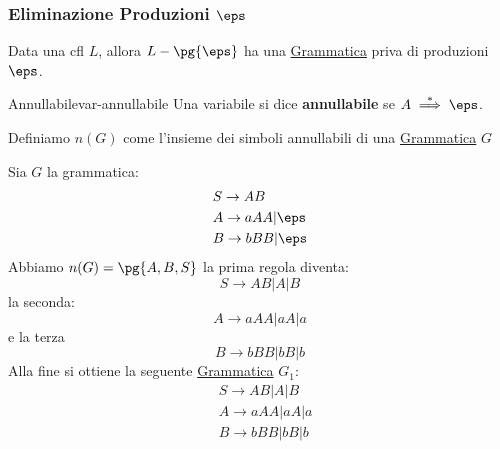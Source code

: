 \subsubsection{Eliminazione Produzioni $\eps$}\label{sub:ll_eliminazione_produzioni_eps} %
Data una \ac{cfl} $L$, allora $L - \pg{\eps}$ ha una \hyperref[def:cfg]{Grammatica} priva di produzioni $\eps$.
\begin{definition}{Annullabile}{var-annullabile}
    Una variabile si dice \textbf{annullabile} se $A \overset{*}{\implies}\eps$.
\end{definition}
\begin{note}
    Definiamo $n(G)$ come l'insieme dei simboli annullabili di una \hyperref[def:cfg]{Grammatica} $G$
\end{note}
\begin{example}{}{}
    Sia $G$ la grammatica:
    \[
        \begin{aligned}
            &S\to AB \\
            &A\to aAA|\eps \\
            &B\to bBB|\eps
        \end{aligned}
    \]
    Abbiamo $n(G) = \pg{A,B,S}$ la prima regola diventa:
    \[
        S\to AB|A|B
    \]
    la seconda:
    \[
        A\to aAA|aA|a
    \]
    e la terza
    \[
        B\to bBB|bB|b
    \]
    Alla fine si ottiene la seguente \hyperref[def:cfg]{Grammatica} $G_1$:
    \[
        \begin{aligned}
            &S\to AB|A|B \\
            &A\to aAA|aA|a \\
            &B\to bBB|bB|b
        \end{aligned}
    \]
\end{example}
%
